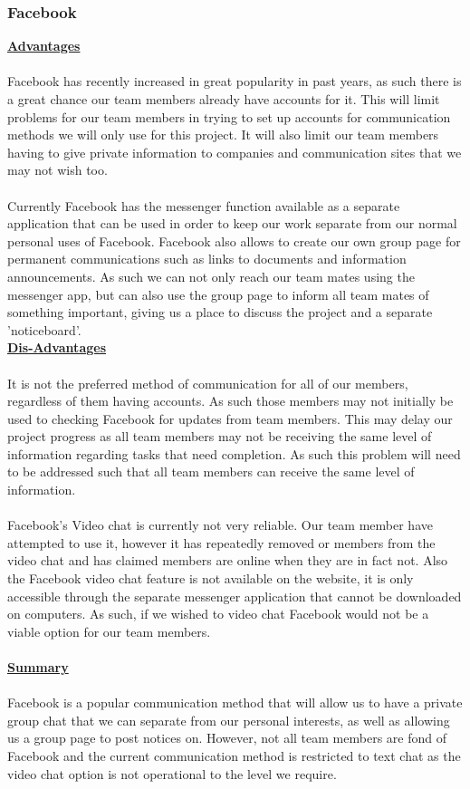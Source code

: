 \documentclass{l3proj}
\begin{document}
\subsubsection{Facebook}
\textbf {\underline{Advantages}}\\
\\
Facebook has recently increased in great popularity in past years, as such there is a great chance our team members already have accounts for it. This will limit problems for our team members in trying to set up accounts for communication methods we will only use for this project. It will also limit our team members having to give private information to companies and communication sites that we may not wish too.\\
\\
Currently Facebook has the messenger function available as a separate application that can be used in order to keep our work separate from our normal personal uses of Facebook. Facebook also allows to create our own group page for permanent communications such as links to documents and information announcements. As such we can not only reach our team mates using the messenger app, but can also use the group page to inform all team mates of something important, giving us a place to discuss the project and a separate 'noticeboard'. \\
\textbf {\underline{Dis-Advantages}}\\
\\
It is not the preferred method of communication for all of our members, regardless of them having accounts. As such those members may not initially be used to checking Facebook for updates from team members. This may delay our project progress as all team members may not be receiving the same level of information regarding tasks that need completion. As such this problem will need to be addressed such that all team members can receive the same level of information. \\
\\
Facebook's Video chat is currently not very reliable. Our team member have attempted to use it, however it has repeatedly removed or members from the video chat and has claimed members are online when they are in fact not. Also the Facebook video chat feature is not available on the website, it is only accessible through the separate messenger application that cannot be downloaded on computers. As such, if we wished to video chat Facebook would not be a viable option for our team members.\\
\\
\textbf {\underline{Summary}}\\
\\
Facebook is a popular communication method that will allow us to have a private group chat that we can separate from our personal interests, as well as allowing us a group page to post notices on. However, not all team members are fond of Facebook and the current communication method is restricted to text chat as the video chat option is not operational to the level we require.\\
\\
\end{document}
